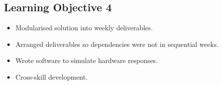 \documentclass[11pt,a4paper]{article}
\begin{document}
\subsection*{Learning Objective 4}

\begin{itemize}
  \item Modularised solution into weekly deliverables.
  \item Arranged deliverables so dependencies were not in sequential weeks.
  \item Wrote software to simulate hardware responses.
  \item Cross-skill development.
\end{itemize}

\end{document}
